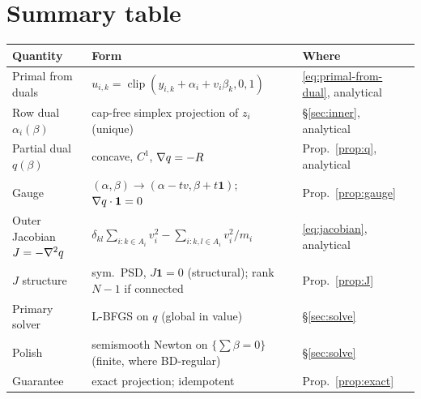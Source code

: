 \documentclass[11pt,a4paper]{article}
\begin{document}
\section*{Summary table}
\begin{center}\small
\begin{tabular}{@{}lll@{}}
\toprule
Quantity & Form & Where \\
\midrule
Primal from duals & $u_{i,k}=\operatorname{clip}(y_{i,k}+\alpha_i+v_i\beta_k,0,1)$ & \eqref{eq:primal-from-dual}, analytical \\
Row dual $\alpha_i(\beta)$ & cap-free simplex projection of $z_i$ (unique) & \S\ref{sec:inner}, analytical \\
Partial dual $q(\beta)$ & concave, $C^1$, $\nabla q=-R$ & Prop.~\ref{prop:q}, analytical \\
Gauge & $(\alpha,\beta)\!\to\!(\alpha-tv,\beta+t\mathbf 1)$; $\nabla q\cdot\mathbf 1=0$ & Prop.~\ref{prop:gauge} \\
Outer Jacobian $J=-\nabla^2 q$ & $\delta_{kl}\sum_{i:k\in A_i}v_i^2-\sum_{i:k,l\in A_i}v_i^2/m_i$ & \eqref{eq:jacobian}, analytical \\
$J$ structure & sym.\ PSD, $J\mathbf 1=0$ (structural); rank $N-1$ if connected & Prop.~\ref{prop:J} \\
Primary solver & L-BFGS on $q$ (global in value) & \S\ref{sec:solve} \\
Polish & semismooth Newton on $\{\sum\beta=0\}$ (finite, where BD-regular) & \S\ref{sec:solve} \\
Guarantee & exact projection; idempotent & Prop.~\ref{prop:exact} \\
\bottomrule
\end{tabular}
\end{center}



\end{document}
